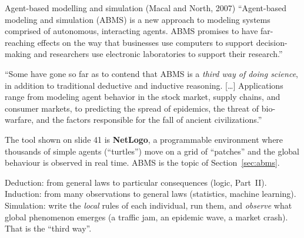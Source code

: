 \begin{nbfact}{Agent-based modelling and simulation (Macal and North, 2007)}
``Agent-based modeling and simulation (ABMS) is a new approach to modeling systems
comprised of autonomous, interacting agents. ABMS promises to have far-reaching effects on
the way that businesses use computers to support decision-making and researchers use
electronic laboratories to support their research.''

``Some have gone so far as to contend that ABMS is a \emph{third way of doing science}, in
addition to traditional deductive and inductive reasoning. [\ldots] Applications range from
modeling agent behavior in the stock market, supply chains, and consumer markets, to
predicting the spread of epidemics, the threat of bio-warfare, and the factors responsible
for the fall of ancient civilizations.''
\end{nbfact}

The tool shown on slide 41 is \textbf{NetLogo}, a programmable environment where thousands
of simple agents (``turtles'') move on a grid of ``patches'' and the global behaviour is
observed in real time. ABMS is the topic of Section~\ref{sec:abms}.

\begin{nbintuition}
Deduction: from general laws to particular consequences (logic, Part~II). Induction: from
many observations to general laws (statistics, machine learning). Simulation: write the
\emph{local} rules of each individual, run them, and \emph{observe} what global phenomenon
emerges (a traffic jam, an epidemic wave, a market crash). That is the ``third way''.
\end{nbintuition}
